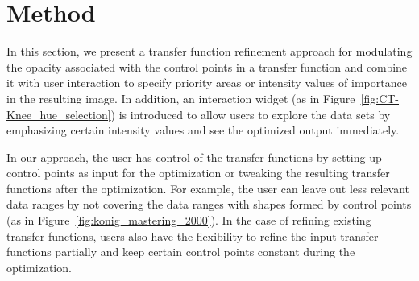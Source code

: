 \section{Method}
In this section, we present a transfer function refinement approach for modulating the opacity associated with the control points in a transfer function and combine it with user interaction to specify priority areas or intensity values of importance in the resulting image.
In addition, an interaction widget (as in Figure~\ref{fig:CT-Knee_hue_selection}) is introduced to allow users to explore the data sets by emphasizing certain intensity values and see the optimized output immediately.

In our approach, the user has control of the transfer functions by setting up control points as input for the optimization or tweaking the resulting transfer functions after the optimization. For example, the user can leave out less relevant data ranges by not covering the data ranges with shapes formed by control points (as in Figure~\ref{fig:konig_mastering_2000}). In the case of refining existing transfer functions, users also have the flexibility to refine the input transfer functions partially and keep certain control points constant during the optimization.

